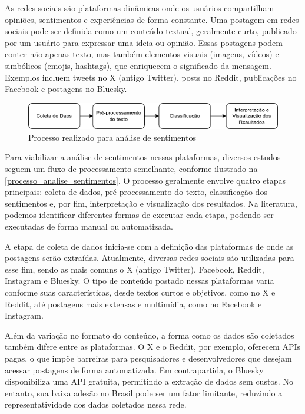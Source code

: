 \documentclass[
	12pt,				%
	oneside,			%
	a4paper,			%
	english,			%
	french,				%
	spanish,			%
	brazil				%
	]{abntex2}
\begin{document}
As redes sociais são plataformas dinâmicas onde os usuários compartilham
opiniões, sentimentos e experiências de forma constante. Uma postagem em
redes sociais pode ser definida como um conteúdo textual, geralmente
curto, publicado por um usuário para expressar uma ideia ou opinião.
Essas postagens podem conter não apenas texto, mas também elementos
visuais (imagens, vídeos) e simbólicos (emojis, hashtags), que
enriquecem o significado da mensagem. Exemplos incluem tweets no X
(antigo Twitter), posts no Reddit, publicações no Facebook e postagens
no Bluesky.

\begin{figure}[htbp]
\hypertarget{processo_analise_sentimentos}{%
\caption{Processo realizado para análise de sentimentos}\label{processo_analise_sentimentos}
\begin{center}
\includegraphics[scale=0.7]{imagens/processo_analise_sentimentos.png}
\end{center}
}
\end{figure}

Para viabilizar a análise de sentimentos nessas plataformas, diversos
estudos seguem um fluxo de processamento semelhante, conforme ilustrado
na \autoref{processo_analise_sentimentos}. O processo geralmente envolve
quatro etapas principais: coleta de dados, pré-processamento do texto,
classificação dos sentimentos e, por fim, interpretação e visualização
dos resultados. Na literatura, podemos identificar diferentes formas de
executar cada etapa, podendo ser executadas de forma manual ou
automatizada.

A etapa de coleta de dados inicia-se com a definição das plataformas de
onde as postagens serão extraídas. Atualmente, diversas redes sociais
são utilizadas para esse fim, sendo as mais comuns o X (antigo Twitter),
Facebook, Reddit, Instagram e Bluesky. O tipo de conteúdo postado nessas
plataformas varia conforme suas características, desde textos curtos e
objetivos, como no X e Reddit, até postagens mais extensas e multimídia,
como no Facebook e Instagram.

Além da variação no formato do conteúdo, a forma como os dados são
coletados também difere entre as plataformas. O X e o Reddit, por
exemplo, oferecem APIs pagas, o que impõe barreiras para pesquisadores e
desenvolvedores que desejam acessar postagens de forma automatizada. Em
contrapartida, o Bluesky disponibiliza uma API gratuita, permitindo a
extração de dados sem custos. No entanto, sua baixa adesão no Brasil
pode ser um fator limitante, reduzindo a representatividade dos dados
coletados nessa rede.
\end{document}
